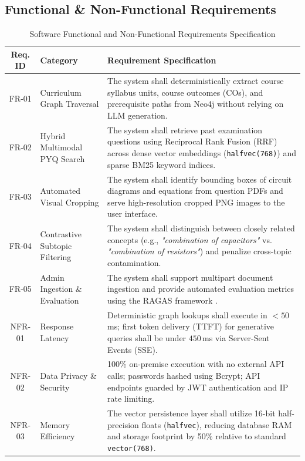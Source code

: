 \documentclass[11pt, a4paper]{article}
\begin{document}
\subsection{Functional \& Non-Functional Requirements}
\begin{table}[H]
    \centering
    \footnotesize
    \renewcommand{\arraystretch}{1.25}
    \begin{tabular}{|c|p{3.0cm}|p{9.4cm}|}
        \hline
        \textbf{Req. ID} & \textbf{Category} & \textbf{Requirement Specification} \\
        \hline
        FR-01 & Curriculum Graph Traversal & The system shall deterministically extract course syllabus units, course outcomes (COs), and prerequisite paths from Neo4j without relying on LLM generation. \\
        \hline
        FR-02 & Hybrid Multimodal PYQ Search & The system shall retrieve past examination questions using Reciprocal Rank Fusion (RRF) across dense vector embeddings (\texttt{halfvec(768)}) and sparse BM25 keyword indices. \\
        \hline
        FR-03 & Automated Visual Cropping & The system shall identify bounding boxes of circuit diagrams and equations from question PDFs and serve high-resolution cropped PNG images to the user interface. \\
        \hline
        FR-04 & Contrastive Subtopic Filtering & The system shall distinguish between closely related concepts (e.g., \textit{"combination of capacitors"} vs. \textit{"combination of resistors"}) and penalize cross-topic contamination. \\
        \hline
        FR-05 & Admin Ingestion \& Evaluation & The system shall support multipart document ingestion and provide automated evaluation metrics using the RAGAS framework \cite{es2024ragas}. \\
        \hline
        NFR-01 & Response Latency & Deterministic graph lookups shall execute in $<50$\,ms; first token delivery (TTFT) for generative queries shall be under $450$\,ms via Server-Sent Events (SSE). \\
        \hline
        NFR-02 & Data Privacy \& Security & 100\% on-premise execution with no external API calls; passwords hashed using Bcrypt; API endpoints guarded by JWT authentication and IP rate limiting. \\
        \hline
        NFR-03 & Memory Efficiency & The vector persistence layer shall utilize 16-bit half-precision floats (\texttt{halfvec}), reducing database RAM and storage footprint by 50\% relative to standard \texttt{vector(768)}. \\
        \hline
    \end{tabular}
    \caption{Software Functional and Non-Functional Requirements Specification}
\end{table}
\end{document}
